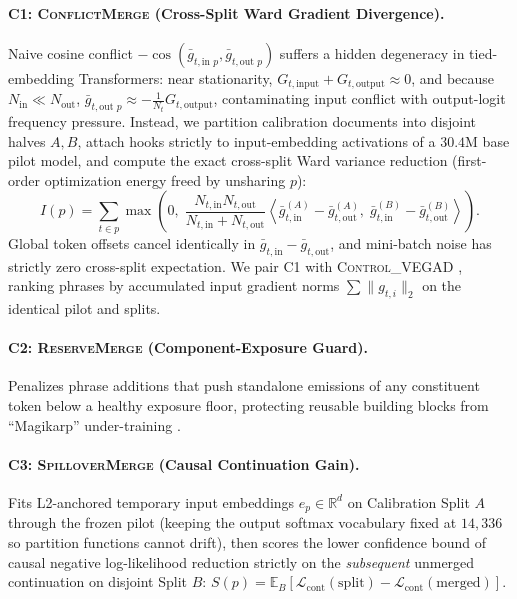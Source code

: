 \documentclass[11pt,a4paper]{article}
\begin{document}
\paragraph{C1: \textsc{ConflictMerge} (Cross-Split Ward Gradient Divergence).}
Naive cosine conflict $-\cos(\bar{g}_{t,\text{in }p}, \bar{g}_{t,\text{out }p})$ suffers a hidden degeneracy in tied-embedding Transformers: near stationarity, $G_{t,\text{input}} + G_{t,\text{output}} \approx 0$, and because $N_{\text{in}} \ll N_{\text{out}}$, $\bar{g}_{t,\text{out }p} \approx -\frac{1}{N_t}G_{t,\text{output}}$, contaminating input conflict with output-logit frequency pressure. Instead, we partition calibration documents into disjoint halves $A, B$, attach hooks strictly to input-embedding activations of a $30.4\text{M}$ base pilot model, and compute the exact cross-split Ward variance reduction (first-order optimization energy freed by unsharing $p$):
\begin{equation}
    I(p) = \sum_{t \in p} \max\!\left(0, \; \frac{N_{t,\text{in}} N_{t,\text{out}}}{N_{t,\text{in}} + N_{t,\text{out}}} \left\langle \bar{g}_{t,\text{in}}^{(A)} - \bar{g}_{t,\text{out}}^{(A)}, \; \bar{g}_{t,\text{in}}^{(B)} - \bar{g}_{t,\text{out}}^{(B)} \right\rangle \right).
\end{equation}
Global token offsets cancel identically in $\bar{g}_{t,\text{in}} - \bar{g}_{t,\text{out}}$, and mini-batch noise has strictly zero cross-split expectation. We pair \textsc{C1} with \textsc{Control\_VEGAD} \citep{liu2024gold}, ranking phrases by accumulated input gradient norms $\sum \|g_{t,i}\|_2$ on the identical pilot and splits.

\paragraph{C2: \textsc{ReserveMerge} (Component-Exposure Guard).} Penalizes phrase additions that push standalone emissions of any constituent token below a healthy exposure floor, protecting reusable building blocks from ``Magikarp'' under-training \citep{land2024fishing}.

\paragraph{C3: \textsc{SpilloverMerge} (Causal Continuation Gain).} Fits L2-anchored temporary input embeddings $e_p \in \mathbb{R}^{d}$ on Calibration Split $A$ through the frozen pilot (keeping the output softmax vocabulary fixed at $14{,}336$ so partition functions cannot drift), then scores the lower confidence bound of causal negative log-likelihood reduction strictly on the \emph{subsequent} unmerged continuation on disjoint Split $B$: $S(p) = \mathbb{E}_B[\mathcal{L}_{\text{cont}}(\text{split}) - \mathcal{L}_{\text{cont}}(\text{merged})]$.
\end{document}
